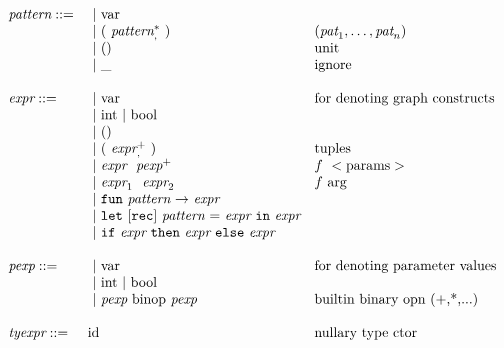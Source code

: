 $  \begin{array}{lll}
    \emph{pattern}  ::= & ~|\   \text{var} & \\
                      & ~|\   \mathtt{(}~\emph{pattern}^*_,~\mathtt{)} & (\emph{pat}_1,\ldots,\emph{pat}_n) \\
                      & ~|\   \mathtt{()} & \text{unit} \\
                      & ~|\   \mathtt{\_} & \text{ignore}\\
    \\
    \emph{expr}  ::= & ~|\   \text{var} & \text{for denoting graph constructs} \\
                 & ~|\   \text{int} ~|~ \text{bool} & \\
                 & ~|\   \mathtt{()} & \\
                 & ~|\   \mathtt{(}~\emph{expr}^+_,~\mathtt{)} & \text{tuples} \\
                 & ~|\   \emph{expr}~~\emph{pexp}^+ & f\ <\text{params}> \\
                      & ~|\   \emph{expr}_1~~\emph{expr}_2 & f\ \text{arg} \\
                 & ~|\   \mathtt{fun}~\emph{pattern}~\mathtt{\rightarrow}~\emph{expr} & \\
                 & ~|\   \mathtt{let}~[\mathtt{rec}]~\emph{pattern}~\mathtt{=}~\emph{expr}~\mathtt{in}~\emph{expr} & \\
                 & ~|\   \mathtt{if}~\emph{expr}~\mathtt{then}~\emph{expr}~\mathtt{else}~\emph{expr} & \\
    \\
    \emph{pexp}  ::= & ~|\   \text{var} & \text{for denoting parameter values}\\
                 & ~|\   \text{int} ~|~ \text{bool} & \\
                 & ~|\   \emph{pexp}~\text{binop}~\emph{pexp} & \text{builtin binary opn (+,*,...)} \\
    \\
    \emph{tyexpr} ::= &  \text{id} & \text{nullary type ctor} \\
  \end{array} $


